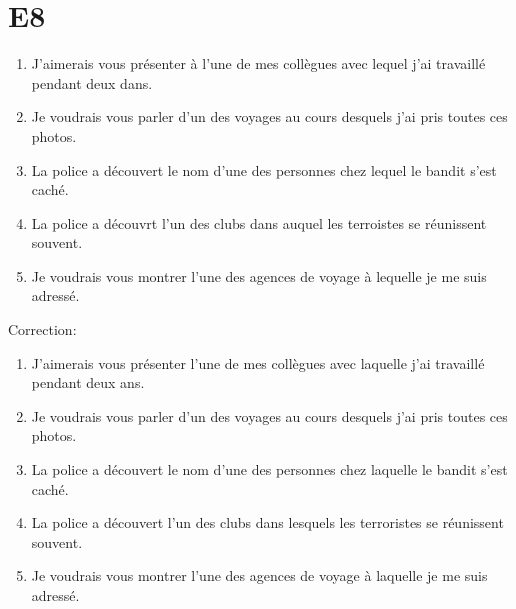 \documentclass{book}
\begin{document}
    \section{E8}
        \begin{enumerate}
            \item J'aimerais vous présenter à l'une de mes collègues avec lequel j'ai travaillé pendant deux dans.
            \item Je voudrais vous parler d'un des voyages au cours desquels j'ai pris toutes ces photos.
            \item La police a découvert le nom d'une des personnes chez lequel le bandit s'est caché.
            \item La police a découvrt l'un des clubs dans auquel les terroistes se réunissent souvent.
            \item Je voudrais vous montrer l'une des agences de voyage à lequelle je me suis adressé.
        \end{enumerate}
        Correction:
        \begin{enumerate}
            \item J'aimerais vous présenter l'une de mes collègues avec laquelle j'ai travaillé pendant deux ans.
            \item Je voudrais vous parler d'un des voyages au cours desquels j'ai pris toutes ces photos.
            \item La police a découvert le nom d'une des personnes chez laquelle le bandit s'est caché.
            \item La police a découvert l'un des clubs dans lesquels les terroristes se réunissent souvent.
            \item Je voudrais vous montrer l'une des agences de voyage à laquelle je me suis adressé.
        \end{enumerate}
\end{document}
